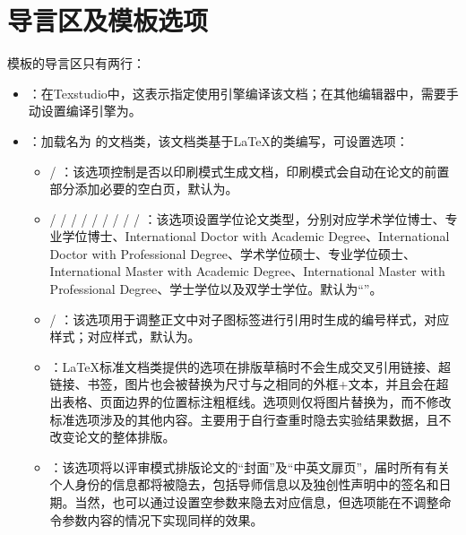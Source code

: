 \documentclass[doctor, vlined]{DissertUESTC}
\begin{document}
	\section{导言区及模板选项}

	模板的导言区只有两行：
	\begin{itemize}
		\item {}：在Texstudio中，这表示指定使用引擎编译该文档；在其他编辑器中，需要手动设置编译引擎为。

		\item {}：加载名为 的文档类，该文档类基于LaTeX的类编写，可设置\textbf{}选项：

		\begin{itemize}
			\item {} / ：该选项控制是否以印刷模式生成文档，印刷模式会自动在论文的前置部分添加必要的空白页，默认为。

			\item {} /  /  /  /  /  /  /  /  / ：该选项设置学位论文类型，分别对应学术学位博士、专业学位博士、International Doctor with Academic Degree、International Doctor with Professional Degree、学术学位硕士、专业学位硕士、International Master with Academic Degree、International Master with Professional Degree、学士学位以及双学士学位。默认为“”。
   
			\item {} / ：该选项用于调整正文中对子图标签进行引用时生成的编号样式，对应样式；对应样式，默认为。
   
			\item {}：LaTeX标准文档类提供的选项在排版草稿时不会生成交叉引用链接、超链接、书签，图片也会被替换为尺寸与之相同的外框+文本，并且会在超出表格、页面边界的位置标注粗框线。选项则仅将图片替换为，而不修改标准选项涉及的其他内容。主要用于自行查重时隐去实验结果数据，且不改变论文的整体排版。
			
			\item {}：该选项将以评审模式排版论文的“封面”及“中英文扉页”，届时所有有关个人身份的信息都将被隐去，包括导师信息以及独创性声明中的签名和日期。当然，也可以通过设置空参数来隐去对应信息，但选项能在不调整命令参数内容的情况下实现同样的效果。
			

\end{itemize}
\end{itemize}
\end{document}
